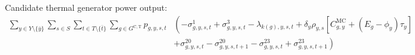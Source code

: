 \documentclass{article}
\newcommand{\sGeneratorsExistingThermal}{G^{\mathrm{E,T}}}
\newcommand{\sGeneratorsCandidateThermal}{G^{\mathrm{C,T}}}
\newcommand{\sYears}{Y}
\newcommand{\sScenarios}{S}
\newcommand{\sIntervals}{T}
\newcommand{\iGenerator}{g}
\newcommand{\iYear}{y}
\newcommand{\iYearTerminal}{\overline{\iYear}}
\newcommand{\iScenario}{s}
\newcommand{\iInterval}{t}
\newcommand{\iIntervalTerminal}{\overline{\iInterval}}
\newcommand{\iZone}{z}
\newcommand{\cScenarioDuration}[1][\iYear,\iScenario]{\rho_{#1}}
\newcommand{\cMarginalCost}[1][\iGenerator,\iYear]{C^{\mathrm{MC}}_{#1}}
\newcommand{\cEmissionsIntensity}[1][\iGenerator]{E_{#1}}
\newcommand{\cInterestRate}{i}
\newcommand{\cDiscountRate}[1][\iYear]{\delta_{#1}}
\newcommand{\vBaseline}[1][\iYear]{\phi_{#1}}
\newcommand{\vPermitPrice}[1][\iYear]{\tau_{#1}}
\newcommand{\vPower}[1][\iGenerator,\iYear,\iScenario,\iInterval]{p_{#1}}
\newcommand{\dMinPowerOutput}[1][\iGenerator,\iYear,\iScenario,\iInterval]{\sigma_{#1}^{1}}
\newcommand{\dMaxPowerOutputExistingThermal}[1][\iGenerator,\iYear,\iScenario,\iInterval]{\sigma_{#1}^{2}}
\newcommand{\dMaxPowerOutputCandidateThermal}[1][\iGenerator,\iYear,\iScenario,\iInterval]{\sigma_{#1}^{3}}
\newcommand{\dRampRateUp}[1][\iGenerator,\iYear,\iScenario,\iInterval]{\sigma_{#1}^{20}}
\newcommand{\dRampRateDown}[1][\iGenerator,\iYear,\iScenario,\iInterval]{\sigma_{#1}^{23}}
\newcommand{\dPowerBalance}[1][\iZone,\iYear,\iScenario,\iInterval]{\lambda_{#1}}
\newcommand{\dGeneratorEnergyOutput}[1][\iGenerator,\iYear,\iScenario,\iInterval]{\zeta_{#1}^{2}}
\begin{document}

Candidate thermal generator power output:
\begin{align}
\sum\limits_{\iYear \in \sYears 
	\setminus \{\iYearTerminal\}
}\sum\limits_{\iScenario \in \sScenarios}\sum\limits_{\iInterval \in \sIntervals \setminus \{\iIntervalTerminal\}} \sum\limits_{\iGenerator \in \sGeneratorsCandidateThermal} \vPower &\left( -\dMinPowerOutput + \dMaxPowerOutputCandidateThermal 
- \dPowerBalance[k(\iGenerator),\iYear,\iScenario,\iInterval] + \cDiscountRate \cScenarioDuration \left[\cMarginalCost + \left(\cEmissionsIntensity - \vBaseline\right)\vPermitPrice \right] \right. \nonumber\\
& \left. + \dRampRateUp - \dRampRateUp[\iGenerator,\iYear,\iScenario,\iInterval + 1] - \dRampRateDown + \dRampRateDown[\iGenerator,\iYear,\iScenario,\iInterval + 1]
\right)\\\nonumber
\end{align}
\end{document}
